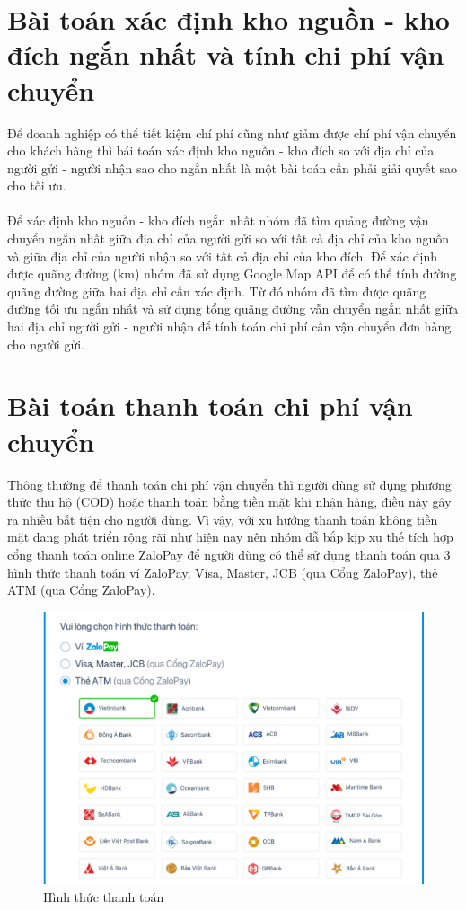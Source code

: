         
			
		\section{Bài toán xác định kho nguồn - kho đích ngắn nhất và tính chi phí vận chuyển}
			Để doanh nghiệp có thể tiết kiệm chí phí cũng như giảm được chí phí vận chuyển cho khách hàng thì bái toán xác định kho nguồn - kho đích so với địa chỉ của người gửi - người nhận sao cho ngắn nhất là một bài toán cần phải giải quyết sao cho tối ưu.\\\\
			\indent	Để xác định kho nguồn - kho đích ngắn nhất nhóm đã tìm quảng đường vận chuyển ngắn nhất giữa địa chỉ của người gửi so với tất cả địa chỉ của kho nguồn và giữa địa chỉ của người nhận so với tất cả địa chỉ của kho đích. Để xác định được quãng đường (km) nhóm đã sử dụng Google Map API để có thể tính đường quãng đường giữa hai địa chỉ cần xác định. Từ đó nhóm đã tìm được quãng đường tối ưu ngắn nhất và sử dụng tổng quãng đường vẫn chuyển ngắn nhất giữa hai địa chỉ người gửi - người nhận để tính toán chi phí cần vận chuyển đơn hàng cho người gửi. 
		\section{Bài toán thanh toán chi phí vận chuyển} 
		Thông thường để thanh toán chi phí vận chuyển thì người dùng sử dụng phương thức thu hộ (COD) hoặc thanh toán bằng tiền mặt khi nhận hàng, điều này gây ra nhiều bất tiện cho người dùng. Vì vậy, với xu hướng thanh toán không tiền mặt đang phát triển rộng rãi như hiện nay nên nhóm đẵ bắp kịp xu thế tích hợp cổng thanh toán online ZaloPay để người dùng có thể sử dụng thanh toán qua 3 hình thức thanh toán ví ZaloPay, Visa, Master, JCB (qua Cổng ZaloPay), thẻ ATM (qua Cổng ZaloPay).
		
		\begin{figure}[!ht]
			\includegraphics[width=1\textwidth]{Images/payment.png}
			\centering
			\linebreak
			\caption{Hình thức thanh toán}
		\end{figure}
